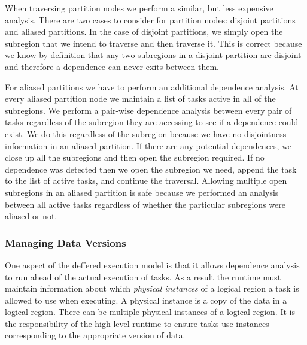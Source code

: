 When traversing partition nodes we perform a similar, but less expensive analysis.  There
are two cases to consider for partition nodes: disjoint partitions and aliased partitions.
In the case of disjoint partitions, we simply open the subregion that we intend to traverse
and then traverse it.  This is correct because we know by definition that any two 
subregions in a disjoint partition are disjoint and therefore a dependence can never exits
between them.

For aliased partitions we have to perform an additional dependence analysis.  At every
aliased partition node we maintain a list of tasks active in all of the subregions.  We
perform a pair-wise dependence analysis between every pair of tasks regardless of the subregion
they are accessing to see if a dependence could exist.  We do this regardless of the subregion
because we have no disjointness information in an aliased partition.  If there are any
potential dependences, we close up all the subregions and then open the subregion required.  If
no dependence was detected then we open the subregion we need, append the task to the list
of active tasks, and continue the traversal.  Allowing multiple open subregions in an aliased
partition is safe because we performed an analysis between all active tasks regardless of
whether the particular subregions were aliased or not.

\subsubsection{Managing Data Versions}
\label{subsec:dataflow}
One aspect of the deffered execution model is that it allows dependence analysis to run
ahead of the actual execution of tasks.  As a result the runtime must maintain information
about which {\em physical instances} of a logical region a task is allowed to use when executing.
A physical instance is a copy of the data in a logical region.  There can be multiple
physical instances of a logical region.  It is the responsibility of the high level runtime
to ensure tasks use instances corresponding to the appropriate version of data.


